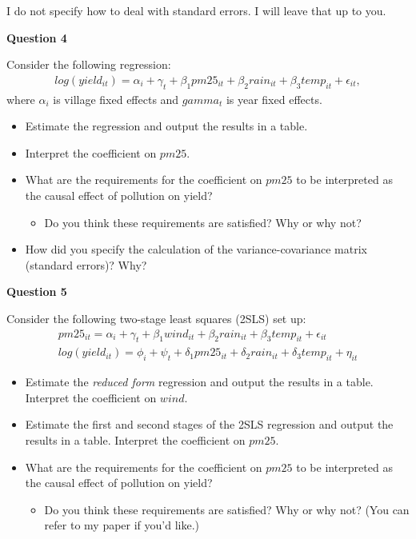 \documentclass[
]{article}
\providecommand{\tightlist}{%
  \setlength{\itemsep}{0pt}\setlength{\parskip}{0pt}}
\begin{document}
I do not specify how to deal with standard errors. I will leave that up to you.

\textbf{Question 4}

Consider the following regression:
\begin{gather} \label{eq:reg} log(yield_{it}) = \alpha_i + \gamma_t + \beta_1 pm25_{it} + \beta_2 rain_{it} + \beta_3 temp_{it} + \epsilon_{it}, \end{gather}
where \(\alpha_i\) is village fixed effects and \(gamma_t\) is year fixed effects.

\begin{itemize}
\tightlist
\item
  Estimate the regression and output the results in a table.
\item
  Interpret the coefficient on \(pm25\).
\item
  What are the requirements for the coefficient on \(pm25\) to be interpreted as the causal effect of pollution on yield?

  \begin{itemize}
  \tightlist
  \item
    Do you think these requirements are satisfied? Why or why not?
  \end{itemize}
\item
  How did you specify the calculation of the variance-covariance matrix (standard errors)? Why?
\end{itemize}

\textbf{Question 5}

Consider the following two-stage least squares (2SLS) set up:
\begin{gather}  \label{eq:iv1} pm25_{it} = \alpha_i + \gamma_t + \beta_1 wind_{it} + \beta_2 rain_{it} + \beta_3 temp_{it} + \epsilon_{it} \\
                \label{eq:iv2} log(yield_{it}) = \phi_i + \psi_t + \delta_1 pm25_{it} + \delta_2 rain_{it} + \delta_3 temp_{it} + \eta_{it} \end{gather}

\begin{itemize}
\tightlist
\item
  Estimate the \emph{reduced form} regression and output the results in a table. Interpret the coefficient on \(wind\).
\item
  Estimate the first and second stages of the 2SLS regression and output the results in a table. Interpret the coefficient on \(pm25\).
\item
  What are the requirements for the coefficient on \(pm25\) to be interpreted as the causal effect of pollution on yield?

  \begin{itemize}
  \tightlist
  \item
    Do you think these requirements are satisfied? Why or why not? (You can refer to my paper if you'd like.)
  \end{itemize}
\end{itemize}
\end{document}
